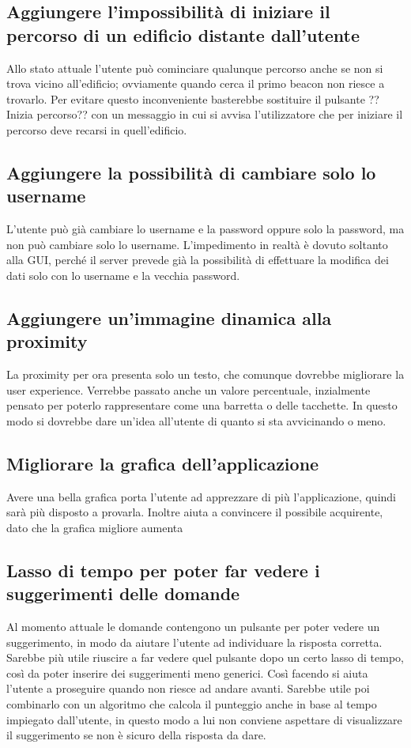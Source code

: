	\subsection{Aggiungere l'impossibilità di iniziare il percorso di un edificio distante dall'utente}
		Allo stato attuale l'utente può cominciare qualunque percorso anche se non si trova vicino all'edificio; ovviamente quando cerca il primo beacon non riesce a trovarlo. Per evitare questo inconveniente basterebbe sostituire il pulsante ??Inizia percorso?? con un messaggio in cui si avvisa l'utilizzatore che per iniziare il percorso deve recarsi in quell'edificio.
	\subsection{Aggiungere la possibilità di cambiare solo lo username}
		L'utente può già cambiare lo username e la password oppure solo la password, ma non può cambiare solo lo username. L'impedimento in realtà è dovuto soltanto alla GUI, perché il server prevede già la possibilità di effettuare la modifica dei dati solo con lo username e la vecchia password.
	\subsection{Aggiungere un'immagine dinamica alla proximity}
		La proximity per ora presenta solo un testo, che comunque dovrebbe migliorare la user experience. Verrebbe passato anche un valore percentuale, inzialmente pensato per poterlo rappresentare come una barretta o delle tacchette. In questo modo si dovrebbe dare un'idea all'utente di quanto si sta avvicinando o meno.
	\subsection{Migliorare la grafica dell'applicazione}
		Avere una bella grafica porta l'utente ad apprezzare di più l'applicazione, quindi sarà più disposto a provarla. Inoltre aiuta a convincere il possibile acquirente, dato che la grafica migliore aumenta
	\subsection{Lasso di tempo per poter far vedere i suggerimenti delle domande}
		Al momento attuale le domande contengono un pulsante per poter vedere un suggerimento, in modo da aiutare l'utente ad individuare la risposta corretta. Sarebbe più utile riuscire a far vedere quel pulsante dopo un certo lasso di tempo, così da poter inserire dei suggerimenti meno generici. Così facendo si aiuta l'utente a proseguire quando non riesce ad andare avanti. Sarebbe utile poi combinarlo con un algoritmo che calcola il punteggio anche in base al tempo impiegato dall'utente, in questo modo a lui non conviene aspettare di visualizzare il suggerimento se non è sicuro della risposta da dare.
